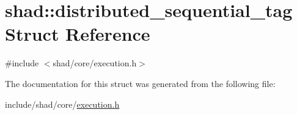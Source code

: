 \hypertarget{structshad_1_1distributed__sequential__tag}{\section{shad\-:\-:distributed\-\_\-sequential\-\_\-tag Struct Reference}
\label{structshad_1_1distributed__sequential__tag}
}


{\ttfamily \#include $<$shad/core/execution.\-h$>$}



The documentation for this struct was generated from the following file\-:\begin{DoxyCompactItemize}
\item 
include/shad/core/\hyperlink{execution_8h}{execution.\-h}\end{DoxyCompactItemize}
